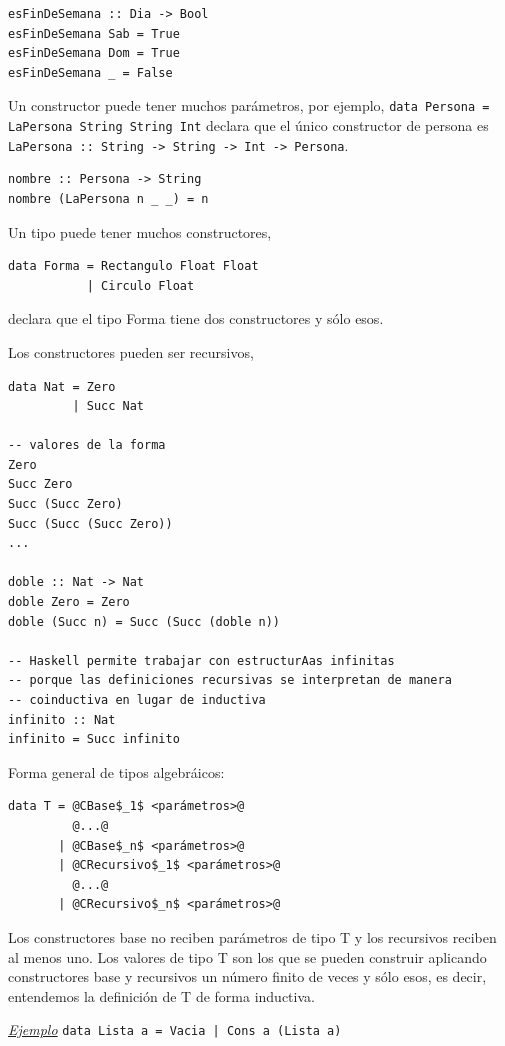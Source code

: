 \documentclass[12pt]{extarticle}
\def\ejemplo{\textit{\underline{Ejemplo} }}
\newcommand\hsline[1]{\texttt{#1}}
\begin{document}
\begin{verbatim}
esFinDeSemana :: Dia -> Bool
esFinDeSemana Sab = True
esFinDeSemana Dom = True
esFinDeSemana _ = False
\end{verbatim}

Un constructor puede tener muchos parámetros, por ejemplo, \hsline{data Persona = LaPersona String String Int} declara que el único constructor de persona es \hsline{LaPersona :: String -> String -> Int -> Persona}.

\begin{verbatim}
nombre :: Persona -> String
nombre (LaPersona n _ _) = n
\end{verbatim}

Un tipo puede tener muchos constructores,

\begin{verbatim}
data Forma = Rectangulo Float Float
           | Circulo Float
\end{verbatim}
declara que el tipo Forma tiene dos constructores y sólo esos.

Los constructores pueden ser recursivos,
\begin{verbatim}
data Nat = Zero
         | Succ Nat

-- valores de la forma
Zero
Succ Zero
Succ (Succ Zero)
Succ (Succ (Succ Zero))
...

doble :: Nat -> Nat
doble Zero = Zero
doble (Succ n) = Succ (Succ (doble n))

-- Haskell permite trabajar con estructurAas infinitas
-- porque las definiciones recursivas se interpretan de manera
-- coinductiva en lugar de inductiva
infinito :: Nat
infinito = Succ infinito
\end{verbatim}

Forma general de tipos algebráicos:

\begin{verbatim}
data T = @CBase$_1$ <parámetros>@
         @...@
       | @CBase$_n$ <parámetros>@
       | @CRecursivo$_1$ <parámetros>@
         @...@
       | @CRecursivo$_n$ <parámetros>@
\end{verbatim}

Los constructores base no reciben parámetros de tipo T y los recursivos reciben al menos uno. Los valores de tipo T son los que se pueden construir aplicando constructores base y recursivos un número finito de veces y sólo esos, es decir, entendemos la definición de T de forma inductiva.

\ejemplo \hsline{data Lista a = Vacia | Cons a (Lista a)}
\end{document}
